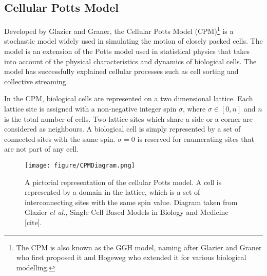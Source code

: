 \documentclass[a4paper,12pt]{article}
\newcommand{\etal}{\textit{et al.}}
\begin{document}
\subsection{Cellular Potts Model}
Developed by Glazier and Graner\cite{graner1992}, the Cellular Potts Model (CPM)\footnote{The CPM is also known as the GGH model, naming after Glazier and Graner who first proposed it and Hogeweg who extended it for various biological modelling.} is a stochastic model widely used in simulating the motion of closely packed cells. The model is an extension of the Potts model used in statistical physics that takes into account of the physical characteristics and dynamics of biological cells. The model has successfully explained cellular processes such as cell sorting \cite{graner1992} and collective streaming\cite{szabo2010}.

In the CPM, biological cells are represented on a two dimensional lattice. Each lattice site is assigned with a non-negative integer spin $\sigma$, where $\sigma \in [0,n]$ and $n$ is the total number of cells. Two lattice sites which share a side or a corner are considered as neighbours. A biological cell is simply represented by a set of connected sites with the same spin. $\sigma = 0$ is reserved for enumerating sites that are not part of any cell.

\begin{figure}[h]
\centering
\texttt{[image: figure/CPMDiagram.png]}
\caption{A pictorial representation of the cellular Potts model. A cell is represented by a domain in the lattice, which is a set of interconnecting sites with the same spin value. Diagram taken from Glazier \etal, Single Cell Based Models in Biology and Medicine [cite].}
\label{fig:CPMDiagram}
\end{figure}
\end{document}
